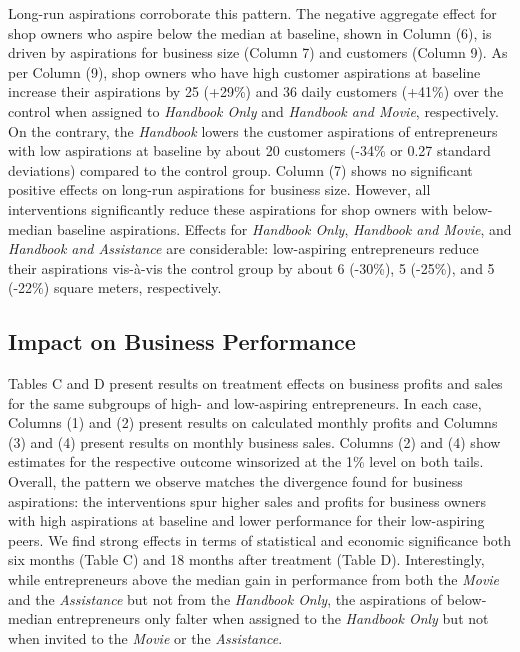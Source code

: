 \documentclass[11.5pt]{article}
\begin{document}
Long-run aspirations corroborate this pattern. The negative aggregate effect for shop owners who aspire below the median at baseline, shown in Column (6), is driven by aspirations for business size (Column 7) and customers (Column 9). As per Column (9), shop owners who have high customer aspirations at baseline increase their aspirations by 25 (+29\%) and 36 daily customers (+41\%) over the control when assigned to \emph{Handbook Only} and \emph{Handbook and Movie}, respectively. On the contrary, the \emph{Handbook} lowers the customer aspirations of entrepreneurs with low aspirations at baseline by about 20 customers (-34\% or 0.27 standard deviations) compared to the control group. Column (7) shows no significant positive effects on long-run aspirations for business size. However, all interventions significantly reduce these aspirations for shop owners with below-median baseline aspirations. Effects for \emph{Handbook Only}, \emph{Handbook and Movie}, and \emph{Handbook and Assistance} are considerable: low-aspiring entrepreneurs reduce their aspirations vis-\`{a}-vis the control group by about 6 (-30\%), 5 (-25\%), and 5 (-22\%) square meters, respectively.


\subsection{Impact on Business Performance}

Tables C and D present results on treatment effects on business profits and sales for the same subgroups of high- and low-aspiring entrepreneurs. In each case, Columns (1) and (2) present results on calculated monthly profits and Columns (3) and (4) present results on monthly business sales. Columns (2) and (4) show estimates for the respective outcome winsorized at the 1\% level on both tails. Overall, the pattern we observe matches the divergence found for business aspirations: the interventions spur higher sales and profits for business owners with high aspirations at baseline and lower performance for their low-aspiring peers. We find strong effects in terms of statistical and economic significance both six months (Table C) and 18 months after treatment (Table D). Interestingly, while entrepreneurs above the median gain in performance from both the \emph{Movie} and the \emph{Assistance} but not from the \emph{Handbook Only}, the aspirations of below-median entrepreneurs only falter when assigned to the \emph{Handbook Only} but not when invited to the \emph{Movie} or the \emph{Assistance}.
\end{document}
